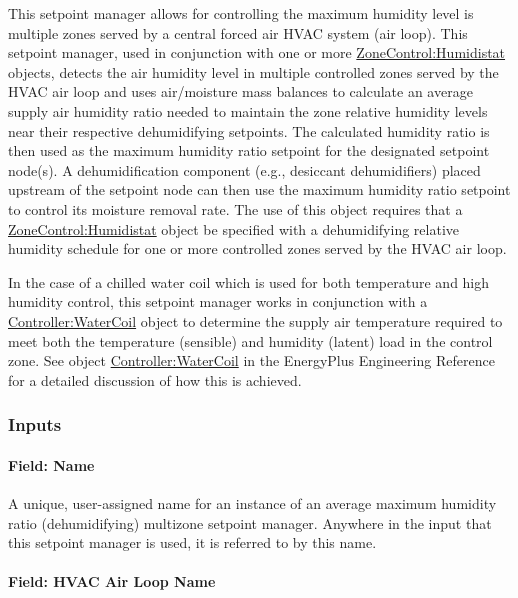 This setpoint manager allows for controlling the maximum humidity level is multiple zones served by a central forced air HVAC system (air loop). This setpoint manager, used in conjunction with one or more \hyperref[zonecontrolhumidistat]{ZoneControl:Humidistat} objects, detects the air humidity level in multiple controlled zones served by the HVAC air loop and uses air/moisture mass balances to calculate an average supply air humidity ratio needed to maintain the zone relative humidity levels near their respective dehumidifying setpoints. The calculated humidity ratio is then used as the maximum humidity ratio setpoint for the designated setpoint node(s). A dehumidification component (e.g., desiccant dehumidifiers) placed upstream of the setpoint node can then use the maximum humidity ratio setpoint to control its moisture removal rate. The use of this object requires that a \hyperref[zonecontrolhumidistat]{ZoneControl:Humidistat} object be specified with a dehumidifying relative humidity schedule for one or more controlled zones served by the HVAC air loop.

In the case of a chilled water coil which is used for both temperature and high humidity control, this setpoint manager works in conjunction with a \hyperref[controllerwatercoil]{Controller:WaterCoil} object to determine the supply air temperature required to meet both the temperature (sensible) and humidity (latent) load in the control zone. See object \hyperref[controllerwatercoil]{Controller:WaterCoil} in the EnergyPlus Engineering Reference for a detailed discussion of how this is achieved.

\subsubsection{Inputs}\label{inputs-17-007}

\paragraph{Field: Name}\label{field-name-17-006}

A unique, user-assigned name for an instance of an average maximum humidity ratio (dehumidifying) multizone setpoint manager. Anywhere in the input that this setpoint manager is used, it is referred to by this name.

\paragraph{Field: HVAC Air Loop Name}\label{field-hvac-air-loop-name-7}

